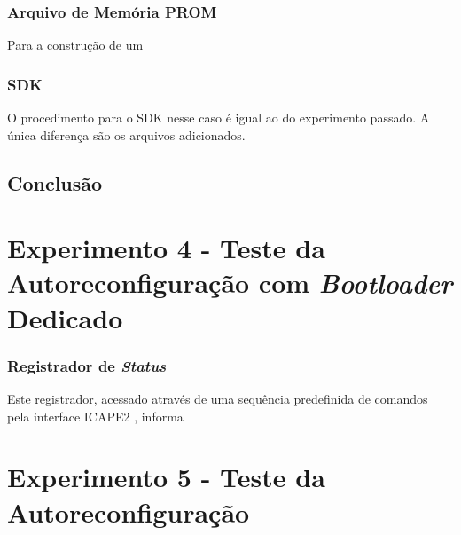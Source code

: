\documentclass[11pt,a4paper,oneside]{book}
\begin{document}
\subsubsection{Arquivo de Memória PROM}
Para a construção de um 

\subsubsection{SDK}
O procedimento para o SDK nesse caso é igual ao do experimento passado.
A única diferença são os arquivos adicionados. 

\subsection{Conclusão}


\section{Experimento 4 - Teste da Autoreconfiguração com \textit{Bootloader} Dedicado}

\subsubsection{Registrador de \textit{Status}}
Este registrador, acessado através de uma sequência predefinida de comandos pela interface ICAPE2 \cite{ug470 - pp108}, informa 

\section{Experimento 5 - Teste da Autoreconfiguração}

\ifx\compilewholereport\undefined
	 
	\newsavebox\mytempbib\savebox\mytempbib{\parbox{\textwidth}{}}

	
\end{document}
